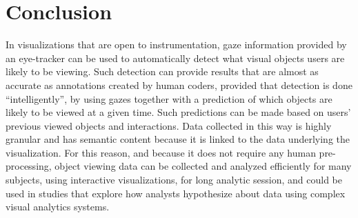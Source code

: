 \section{Conclusion}
In visualizations that are open to instrumentation, gaze information provided by an eye-tracker can be used to automatically detect what visual objects users are likely to be viewing. Such detection can provide results that are almost as accurate as annotations created by human coders, provided that detection is done ``intelligently'', by using gazes together with a prediction of which objects are likely to be viewed at a given time. Such predictions can be made based on users' previous viewed objects and interactions. Data collected in this way is highly granular and has semantic content because it is linked to the data underlying the visualization. For this reason, and because it does not require any human pre-processing, object viewing data can be collected and analyzed efficiently for many subjects, using interactive visualizations, for long analytic session, and could be used in studies that explore how analysts hypothesize about data using complex visual analytics systems.    